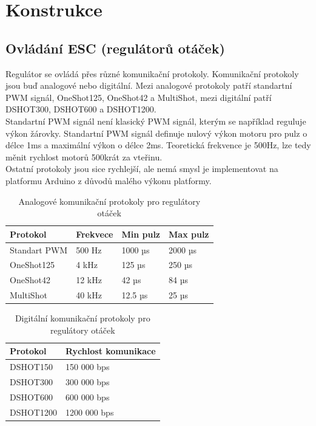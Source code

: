 \chapter{Konstrukce}
\label{4-algoritmus}

\section{Ovládání ESC (regulátorů otáček)}
Regulátor se ovládá přes různé komunikační protokoly. Komunikační protokoly jsou buď analogové nebo digitální. Mezi analogové protokoly patří standartní PWM signál, OneShot125, OneShot42 a MultiShot, mezi digitální patří  DSHOT300, DSHOT600 a DSHOT1200. \cite{comregul}\\
Standartní PWM signál není klasický PWM signál, kterým se například reguluje výkon žárovky. Standartní PWM signál definuje nulový výkon motoru pro pulz o délce 1ms a maximální výkon o délce 2ms. Teoretická frekvence je 500Hz, lze tedy měnit rychlost motorů 500krát za vteřinu.\\
Ostatní protokoly jsou sice rychlejší, ale nemá smysl je implementovat na platformu Arduino z důvodů malého výkonu platformy.\\ 

\begin{table}[H]
\centering
	\begin{tabular}{|l|l|l|l|}
		\hline
		\textbf{Protokol} & \textbf{Frekvece} & \textbf{Min pulz} & \textbf{Max pulz} \\ \hline
		Standart PWM      & 500 Hz            & 1000 µs            & 2000 µs            \\ \hline
		OneShot125        & 4 kHz             & 125 µs             & 250 µs             \\ \hline
		OneShot42         & 12 kHz            & 42 µs              & 84 µs              \\ \hline
		MultiShot         & 40 kHz            & 12.5 µs            & 25 µs              \\ \hline
	\end{tabular}
\caption{Analogové komunikační protokoly pro regulátory otáček}
\end{table}

\begin{table}[H]
	\centering
	\begin{tabular}{|l|l|}
		\hline
		\textbf{Protokol} & \textbf{Rychlost komunikace} \\ \hline
		DSHOT150          & 150 000 bps                  \\ \hline
		DSHOT300          & 300 000 bps                  \\ \hline
		DSHOT600          & 600 000 bps                  \\ \hline
		DSHOT1200         & 1200 000 bps                 \\ \hline
	\end{tabular}
\caption{Digitální komunikační protokoly pro regulátory otáček}
\end{table}

